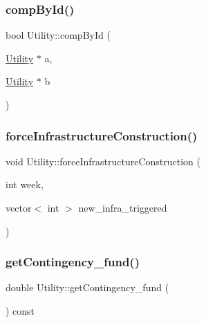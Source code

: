 \subsubsection{\texorpdfstring{comp\+By\+Id()}{compById()}}
{\footnotesize\ttfamily bool Utility\+::comp\+By\+Id (\begin{DoxyParamCaption}\item[{\mbox{\hyperlink{classUtility}{Utility}} $\ast$}]{a,  }\item[{\mbox{\hyperlink{classUtility}{Utility}} $\ast$}]{b }\end{DoxyParamCaption})\hspace{0.3cm}{\ttfamily [static]}}

\mbox{\label{classUtility_a7daa5b948a370eca83bc8c63890f6b19_a7daa5b948a370eca83bc8c63890f6b19}} 
\subsubsection{\texorpdfstring{force\+Infrastructure\+Construction()}{forceInfrastructureConstruction()}}
{\footnotesize\ttfamily void Utility\+::force\+Infrastructure\+Construction (\begin{DoxyParamCaption}\item[{int}]{week,  }\item[{vector$<$ int $>$}]{new\+\_\+infra\+\_\+triggered }\end{DoxyParamCaption})}

\mbox{\label{classUtility_ab396bc312d5e5ddc0554138060a8a4d3_ab396bc312d5e5ddc0554138060a8a4d3}} 
\subsubsection{\texorpdfstring{get\+Contingency\+\_\+fund()}{getContingency\_fund()}}
{\footnotesize\ttfamily double Utility\+::get\+Contingency\+\_\+fund (\begin{DoxyParamCaption}{ }\end{DoxyParamCaption}) const}

